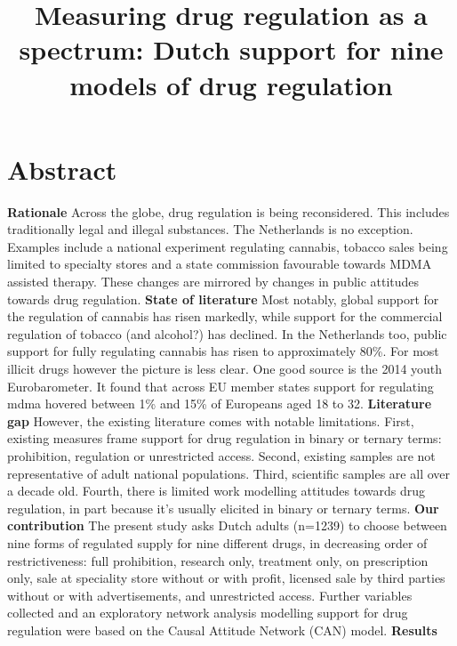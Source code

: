 \documentclass[11pt,a4paper]{article}
\title{Measuring drug regulation as a spectrum: Dutch support for nine models of drug regulation}
\author{}
\date{}
\begin{document}
\maketitle
\vspace{-3em}

\section{Abstract}

\textbf{Rationale} Across the globe, drug regulation is being reconsidered. This includes traditionally legal and illegal substances. The Netherlands is no exception. Examples include a national experiment regulating cannabis, tobacco sales being limited to specialty stores and a state commission favourable towards MDMA assisted therapy. These changes are mirrored by changes in public attitudes towards drug regulation.  \newline
\textbf{State of literature} Most notably, global support for the regulation of cannabis has risen markedly, while support for the commercial regulation of tobacco (and alcohol?) has declined. In the Netherlands too, public support for fully regulating cannabis has risen to approximately 80\%. For most illicit drugs however the picture is less clear. One good source is the 2014 youth Eurobarometer. It found that across EU member states support for regulating mdma hovered between 1\% and 15\% of Europeans aged 18 to 32. \newline
\textbf{Literature gap} However, the existing literature comes with notable limitations. First, existing measures frame support for drug regulation in binary or ternary terms: prohibition, regulation or unrestricted access. Second, existing samples are not representative of adult national populations. Third, scientific samples are all over a decade old. Fourth, there is limited work modelling attitudes towards drug regulation, in part because it's usually elicited in binary or ternary terms. \newline
\textbf{Our contribution} The present study asks Dutch adults (n=1239) to choose between nine forms of regulated supply for nine different drugs, in decreasing order of restrictiveness: full prohibition, research only, treatment only, on prescription only, sale at speciality store without or with profit, licensed sale by third parties without or with advertisements, and unrestricted access. Further variables collected and an exploratory network analysis modelling support for drug regulation were based on the Causal Attitude Network (CAN) model.  \newline
\textbf{Results}
\end{document}
